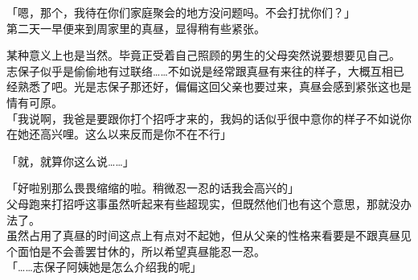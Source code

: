 

「嗯，那个，我待在你们家庭聚会的地方没问题吗。不会打扰你们？」\\

第二天一早便来到周家里的真昼，显得稍有些紧张。

某种意义上也是当然。毕竟正受着自己照顾的男生的父母突然说要想要见自己。\\

志保子似乎是偷偷地有过联络……不如说是经常跟真昼有来往的样子，大概互相已经熟悉了吧。光是志保子那还好，偏偏这回父亲也要过来，真昼会感到紧张这也是情有可原。\\

「我说啊，我爸是要跟你打个招呼才来的，我妈的话似乎很中意你的样子不如说你在她还高兴哩。这么以来反而是你不在不行」

「就，就算你这么说……」

「好啦别那么畏畏缩缩的啦。稍微忍一忍的话我会高兴的」\\

父母跑来打招呼这事虽然听起来有些超现实，但既然他们也有这个意思，那就没办法了。\\

虽然占用了真昼的时间这点上有点对不起她，但从父亲的性格来看要是不跟真昼见个面怕是不会善罢甘休的，所以希望真昼能忍一忍。\\

「……志保子阿姨她是怎么介绍我的呢」

